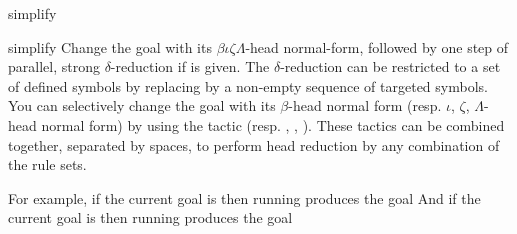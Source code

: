 \begin{tactic}{simplify}
  \begin{tsyntax}[empty]{simplify}
  Change the goal with its $\beta\iota\zeta\Lambda$-head normal-form, followed
  by one step of parallel, strong $\delta$-reduction if  is given.
  The $\delta$-reduction can be restricted to a set of defined symbols by
  replacing  by a non-empty sequence of targeted symbols. You can
  selectively change the goal with its $\beta$-head normal form
  (resp. $\iota$, $\zeta$, $\Lambda$-head normal form) by using the tactic
   (resp. , , ). These tactics can be
  combined together, separated by spaces, to perform head reduction by any
  combination of the rule sets.

  For example, if the current goal is
   then
  running 
  produces the goal
  And if the current goal is
   then
  running 
  produces the goal
  \end{tsyntax}
\end{tactic}
